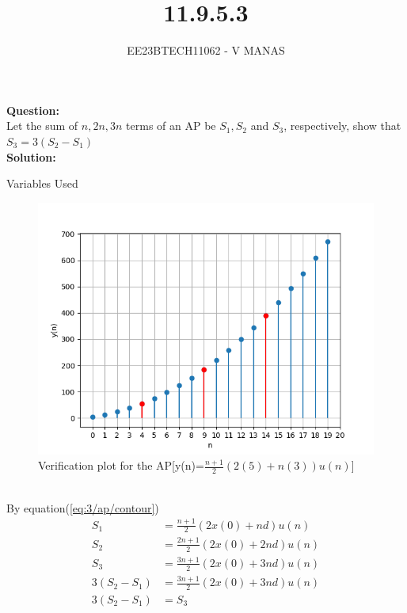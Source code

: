 \documentclass[journal,12pt,twocolumn]{IEEEtran}
\theoremstyle{remark}
\begin{document}

\vspace{3cm}

\title{11.9.5.3}
\author{EE23BTECH11062 - V MANAS}
\maketitle
\newpage

\bigskip
\textbf{Question:}\\Let the sum of $n,2n,3n$ terms of an AP be $S_1,S_2$ and $S_3$, respectively, show that $S_3=3(S_2-S_1)$\\
\textbf{Solution:}
\begin{table}[h]
    \centering
    
    \caption{Variables Used}
    \label{tab:table_11.9.5.3}
\end{table}
\begin{figure}[h]
    \centering
    \includegraphics[width=1.3\linewidth]{figs/graph.png}
    \caption{Verification plot for the AP[y(n)=$\frac{n+1}{2}(2(5)+n(3))u(n)$]}
\end{figure}\\
By equation(\ref{eq:3/ap/contour})
\begin{align}
    S_1&=\frac{n+1}{2}(2x(0)+nd)u(n)\\
    S_2&=\frac{2n+1}{2}(2x(0)+2nd)u(n)\\
    S_3&=\frac{3n+1}{2}(2x(0)+3nd)u(n)\\
    3(S_2-S_1)&=\frac{3n+1}{2}(2x(0)+3nd)u(n)\\
    3(S_2-S_1)&=S_3
\end{align}
\end{document}
